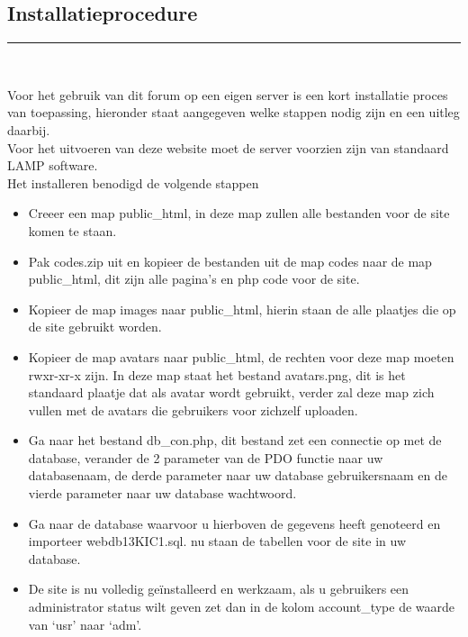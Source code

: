 \documentclass[a4paper,12pt]{article}
\newcommand{\HRule}{\rule{\linewidth}{0.5mm}}
\begin{document}
\begin{center}
\section[Installatieprocedure]{Installatieprocedure}
\HRule \\[0.5cm]
\end{center}
Voor het gebruik van dit forum op een eigen server is een kort installatie proces van toepassing, hieronder staat aangegeven welke stappen nodig zijn en een uitleg daarbij.\\
Voor het uitvoeren van deze website moet de server voorzien zijn van standaard LAMP software.\\

Het installeren benodigd de volgende stappen
\begin{itemize}
\item Creeer een map public\_html, in deze map zullen alle bestanden voor de site komen te staan.
\item Pak codes.zip uit en kopieer de bestanden uit de map codes naar de map public\_html, dit zijn alle pagina’s en php code voor de site.
\item Kopieer de map images naar public\_html, hierin staan de alle plaatjes die op de site gebruikt worden.
\item Kopieer de map avatars naar public\_html, de rechten voor deze map moeten rwxr-xr-x  zijn. In deze map staat het bestand avatars.png, dit is het standaard plaatje dat als avatar wordt gebruikt, verder zal deze map zich vullen met de avatars die gebruikers voor zichzelf uploaden.
\item Ga naar het bestand db\_con.php, dit bestand zet een connectie op met de database, verander de 2 parameter van de PDO functie naar uw databasenaam, de derde parameter naar uw database gebruikersnaam en de vierde parameter naar uw database wachtwoord.
\item Ga naar de database waarvoor u hierboven de gegevens heeft genoteerd en importeer webdb13KIC1.sql. nu staan de tabellen voor de site in uw database.
\item De site is nu volledig geïnstalleerd en werkzaam, als u gebruikers een administrator status wilt geven zet dan in de kolom account\_type de waarde van ‘usr’ naar ‘adm’.
\end{itemize}
\end{document}
